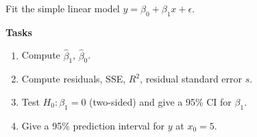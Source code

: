 \documentclass[12pt]{article}
\begin{document}
Fit the simple linear model \(y=\beta_{0}+\beta_{1}x+\epsilon\).

\textbf{Tasks}

\begin{enumerate}
\item Compute \(\hat{\beta}_{1}\), \(\hat{\beta}_{0}\).
\item Compute residuals, SSE, \(R^{2}\), residual standard error \(s\).
\item Test \(H_{0}:\beta_{1}=0\) (two-sided) and give a 95\% CI for \(\beta_{1}\).
\item Give a 95\% prediction interval for \(y\) at \(x_{0}=5\).
\end{enumerate}
\end{document}
